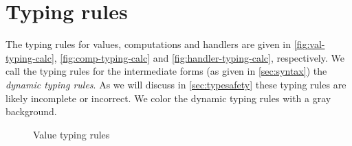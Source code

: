 {\section{Typing rules}
\label{sec:typingrules}

The typing rules for values, computations and handlers are given in \cref{fig:val-typing-calc}, \cref{fig:comp-typing-calc} and \cref{fig:handler-typing-calc}, respectively.
We call the typing rules for the intermediate forms (as given in \cref{sec:syntax}) the \emph{dynamic typing rules}.
As we will discuss in \cref{sec:typesafety} these typing rules are likely incomplete or incorrect.
We color the dynamic typing rules with a gray background.

\begin{figure}[h]
\caption{Value typing rules}
\centering
{}
\end{figure}

}
